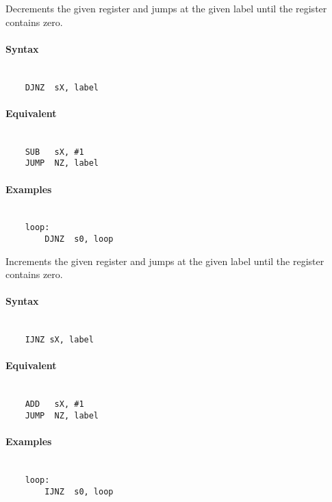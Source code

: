     Decrements the given register and jumps at the given label until the register contains zero.

    \paragraph{Syntax}
        ~\\
        \verb'    DJNZ  sX, label'

    \paragraph{Equivalent}
        ~\\
        \verb'    SUB   sX, #1'\\
        \verb'    JUMP  NZ, label'

    \paragraph{Examples}
        ~\\
        \verb'    loop:             '\\
        \verb'        DJNZ  s0, loop'

\clearpage
{}
    Increments the given register and jumps at the given label until the register contains zero.

    \paragraph{Syntax}
        ~\\
        \verb'    IJNZ sX, label'

    \paragraph{Equivalent}
        ~\\
        \verb'    ADD   sX, #1'\\
        \verb'    JUMP  NZ, label'

    \paragraph{Examples}
        ~\\
        \verb'    loop:             '\\
        \verb'        IJNZ  s0, loop'
